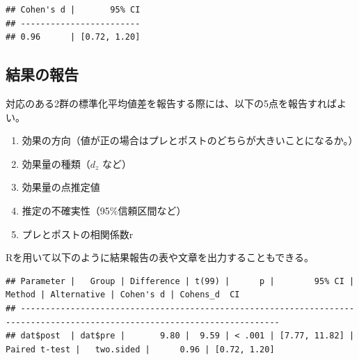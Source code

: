 \documentclass[
  ja=standard, xelatex, base=12pt]{bxjsreport}
\newenvironment{Shaded}{\begin{snugshade}}{\end{snugshade}}
\newcommand{\AttributeTok}[1]{\textcolor[rgb]{0.77,0.63,0.00}{#1}}
\newcommand{\CommentTok}[1]{\textcolor[rgb]{0.56,0.35,0.01}{\textit{#1}}}
\newcommand{\FunctionTok}[1]{\textcolor[rgb]{0.00,0.00,0.00}{#1}}
\newcommand{\NormalTok}[1]{#1}
\newcommand{\SpecialCharTok}[1]{\textcolor[rgb]{0.00,0.00,0.00}{#1}}
\providecommand{\tightlist}{%
  \setlength{\itemsep}{0pt}\setlength{\parskip}{0pt}}
\begin{document}
\begin{verbatim}
## Cohen's d |       95% CI
## ------------------------
## 0.96      | [0.72, 1.20]
\end{verbatim}

\hypertarget{ux7d50ux679cux306eux5831ux544a-2}{%
\subsection{結果の報告}\label{ux7d50ux679cux306eux5831ux544a-2}}

対応のある2群の標準化平均値差を報告する際には、以下の5点を報告すればよい。

\begin{enumerate}
\def\labelenumi{\arabic{enumi}.}
\tightlist
\item
  効果の方向（値が正の場合はプレとポストのどちらが大きいことになるか。）
\item
  効果量の種類（\(d_z\) など）
\item
  効果量の点推定値
\item
  推定の不確実性（95\%信頼区間など）
\item
  プレとポストの相関係数r
\end{enumerate}

Rを用いて以下のように結果報告の表や文章を出力することもできる。

\begin{Shaded}
\end{Shaded}

\begin{verbatim}
## Parameter |   Group | Difference | t(99) |      p |        95% CI |        Method | Alternative | Cohen's d | Cohens_d  CI
## --------------------------------------------------------------------------------------------------------------------------
## dat$post  | dat$pre |       9.80 |  9.59 | < .001 | [7.77, 11.82] | Paired t-test |   two.sided |      0.96 | [0.72, 1.20]
\end{verbatim}

\begin{Shaded}
\end{Shaded}
\end{document}
